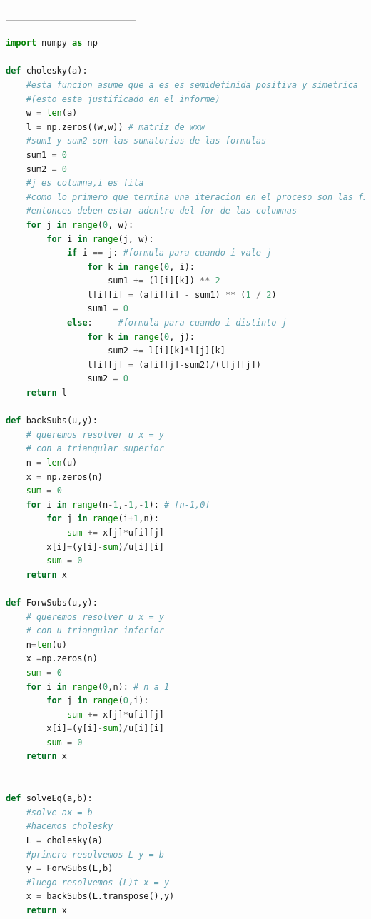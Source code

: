 ---------------------------------------------------------------------------------------------------------------------------------------------------
\begin{lstlisting}[language=Python, caption=utils.py]
import numpy as np

def cholesky(a):
    #esta funcion asume que a es es semidefinida positiva y simetrica
    #(esto esta justificado en el informe)
    w = len(a)
    l = np.zeros((w,w)) # matriz de wxw
    #sum1 y sum2 son las sumatorias de las formulas
    sum1 = 0
    sum2 = 0
    #j es columna,i es fila
    #como lo primero que termina una iteracion en el proceso son las filas
    #entonces deben estar adentro del for de las columnas
    for j in range(0, w):
        for i in range(j, w):
            if i == j: #formula para cuando i vale j
                for k in range(0, i):
                    sum1 += (l[i][k]) ** 2
                l[i][i] = (a[i][i] - sum1) ** (1 / 2)
                sum1 = 0
            else:     #formula para cuando i distinto j
                for k in range(0, j):
                    sum2 += l[i][k]*l[j][k]
                l[i][j] = (a[i][j]-sum2)/(l[j][j])
                sum2 = 0
    return l

def backSubs(u,y):
    # queremos resolver u x = y
    # con a triangular superior
    n = len(u)
    x = np.zeros(n)
    sum = 0
    for i in range(n-1,-1,-1): # [n-1,0]
        for j in range(i+1,n):
            sum += x[j]*u[i][j]
        x[i]=(y[i]-sum)/u[i][i]
        sum = 0
    return x

def ForwSubs(u,y):
    # queremos resolver u x = y
    # con u triangular inferior
    n=len(u)
    x =np.zeros(n)
    sum = 0
    for i in range(0,n): # n a 1
        for j in range(0,i):
            sum += x[j]*u[i][j]
        x[i]=(y[i]-sum)/u[i][i]
        sum = 0
    return x


def solveEq(a,b):
    #solve ax = b
    #hacemos cholesky
    L = cholesky(a)
    #primero resolvemos L y = b
    y = ForwSubs(L,b)
    #luego resolvemos (L)t x = y
    x = backSubs(L.transpose(),y)
    return x
\end{lstlisting}

